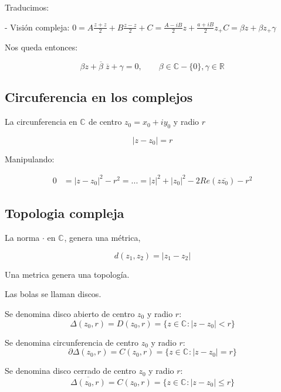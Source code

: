 Traducimos:

- Visión compleja: \(0 = A \frac{z+z}{2}+B \frac{z-z}{2} + C = \frac{A-iB}{2}z+\frac{a+iB}{2}z_ + C = \beta z + \beta z_ + \gamma \) 

Nos queda entonces:

\[\beta z + \overline{\beta} \; \overline{z} + \gamma = 0, \qquad \beta \in \mathbb{C}-\{0\}, \gamma \in \mathbb{R}^{}\]

\subsection{Circuferencia en los complejos}

\begin{definicion}
  La circunferencia en \(\mathbb{C}^{}\) de centro \(z_0=x_0+iy_0\) y radio \(r\)
  
  \begin{equation}
    |z-z_0| = r
  \end{equation}

  Manipulando:

\end{definicion}

\begin{eqnarray*} %
  0 & = |z-z_0|^2 -r^2 = ... = |z|^2+|z_0|^2-2 Re(z\overline{z_0}) - r^2
\end{eqnarray*}

\subsection{Topologia compleja}
La norma \( \cdot \) en \(\mathbb{C}^{}\), genera una métrica,

\[d(z_1,z_2) = |z_1 - z_2|\]

Una metrica genera una topología.

Las bolas se llaman discos.

\begin{definicion}
  Se denomina disco abierto de centro \(z_0\) y radio \(r\):
  \[ \Delta (z_0, r) = D(z_0,r) = \{z \in \mathbb{C}^{} : |z-z_0|< r\}\]
\end{definicion}
\begin{definicion}[Circuferencia]
  Se denomina circunferencia de centro \(z_0\) y radio \(r\):
  \[ \partial \Delta (z_0, r) = C(z_0,r) = \{z \in \mathbb{C}^{} : |z-z_0| = r\}\]
\end{definicion}
\begin{definicion}
  Se denomina disco cerrado de centro \(z_0\) y radio \(r\):
  \[ \overline{\Delta (z_0, r) }= C(z_0,r) = \{z \in \mathbb{C}^{} : |z-z_0| \leq r\}\]
\end{definicion}

